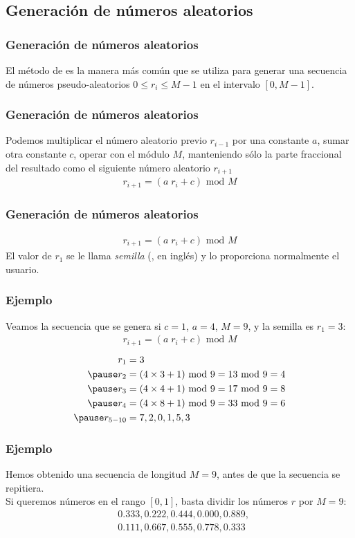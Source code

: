 \documentclass[12pt]{beamer}
\begin{document}
\subsection{Generación de números aleatorios}
\begin{frame}
\frametitle{Generación de números aleatorios}
El método de  es la manera más común que se utiliza para generar una
secuencia de números pseudo-aleatorios $0 \leq r_{i} \leq M - 1$ en el intervalo $[0, M -1]$.
\end{frame}
\begin{frame}
\frametitle{Generación de números aleatorios}
Podemos multiplicar el número aleatorio previo $r_{i-1}$ por una constante $a$, \pause sumar otra constante $c$, \pause operar con el módulo $M$, manteniendo sólo la parte fraccional del resultado como el siguiente número aleatorio $r_{i+1}$
\pause
\begin{align*}
r_{i+1} = (a \; r_{i} + c) \mbox{ mod } M
\end{align*}
\end{frame}
\begin{frame}
\frametitle{Generación de números aleatorios}
\begin{align*}
r_{i+1} = (a \; r_{i} + c) \mbox{ mod } M
\end{align*}
El valor de $r_{1}$ se le llama \emph{semilla} (, en inglés) y lo proporciona normalmente el usuario.
\end{frame}
\begin{frame}
\frametitle{Ejemplo}
Veamos la secuencia que se genera si $c = 1$, $a = 4$, $M = 9$, y la semilla es $r_{1} = 3$:
\begin{align*}
r_{i+1} = (a \; r_{i} + c) \mbox{ mod } M
\end{align*}
\pause
\begin{eqnarray*}
\begin{aligned}
r_{1} &= 3 \\ \pause
r_{2} &= (4 \times 3  + 1) \mbox{ mod } 9 = 13 \mbox{ mod } 9 = 4 \\ \pause
r_{3} &= (4 \times 4  + 1) \mbox{ mod } 9 = 17 \mbox{ mod } 9 = 8 \\ \pause
r_{4} &= (4 \times 8  + 1) \mbox{ mod } 9 = 33 \mbox{ mod } 9 = 6 \\ \pause
r_{5 - 10} &= 7, 2, 0, 1, 5, 3
\end{aligned}
\end{eqnarray*}
\end{frame}
\begin{frame}
\frametitle{Ejemplo}
Hemos obtenido una secuencia de longitud $M = 9$, antes de que la secuencia se repitiera.
\\
\bigskip
Si queremos números en el rango $[0, 1]$, basta dividir los números $r$ por $M = 9$:
\begin{align*}
&0.333, 0.222, 0.444, 0.000, 0.889, \\
&0.111, 0.667, 0.555, 0.778, 0.333
\end{align*}
\end{frame}
\end{document}
